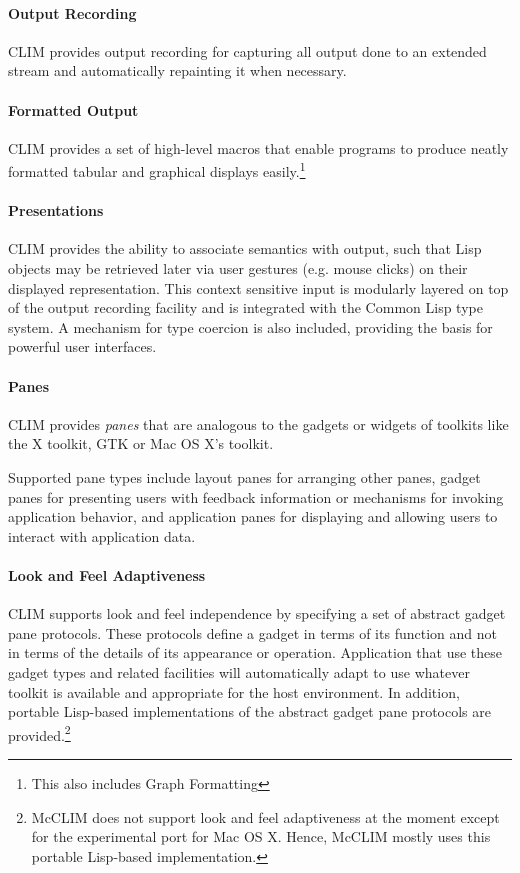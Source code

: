 \documentclass[twocolumn,a4paper]{article}
\newcommand {\concept} [1] {{\sl #1}\index{#1}}
\newcommand {\CLIM}{{\small CLIM}}
\begin{document}
\paragraph*{Output Recording} \CLIM{} provides output recording for capturing all output done to an extended stream and automatically repainting it when necessary. 

\paragraph*{Formatted Output} \CLIM{} provides a set of high-level macros that enable programs to produce neatly formatted tabular and graphical displays easily.\footnote{This also includes Graph Formatting}

\paragraph*{Presentations} \CLIM{} provides the ability to associate semantics with output, such that Lisp objects may be retrieved later via user gestures (e.g. mouse clicks) on their displayed representation. This context sensitive input is modularly layered on top of the output recording facility and is integrated with the Common Lisp type system. A mechanism for type coercion is also included, providing the basis for powerful user interfaces.

\paragraph*{Panes} \CLIM{} provides \concept{panes} that are analogous to the gadgets or widgets of toolkits like the X toolkit, GTK or Mac OS X's toolkit.

Supported pane types include layout panes for arranging other panes, gadget panes for presenting users with feedback information or mechanisms for invoking application behavior, and application panes for displaying and allowing users to interact with application data.

\paragraph*{Look and Feel Adaptiveness} \CLIM{} supports look and feel independence by specifying a set of abstract gadget pane protocols. These protocols define a gadget in terms of its function and not in terms of the details of its appearance or operation. Application that use these gadget types and related facilities will automatically adapt to use whatever toolkit is available and appropriate for the host environment. In addition, portable Lisp-based implementations of the abstract gadget pane protocols are provided.\footnote{McCLIM does not support look and feel adaptiveness at the moment except for the experimental port for Mac OS X. Hence, McCLIM mostly uses this portable Lisp-based implementation.}
\end{document}
